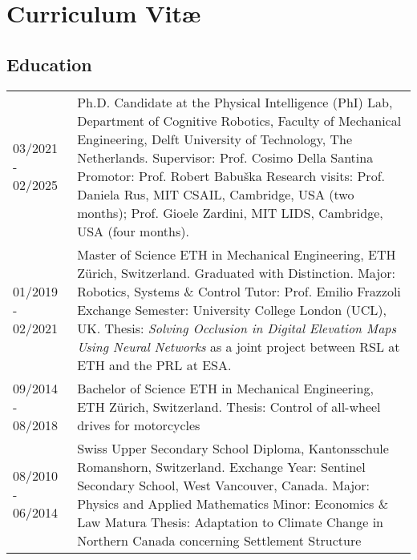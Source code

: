 \chapter*{Curriculum Vit\ae}

\makeatletter
\authors{\@firstname\ {\titleshape\@lastname}}
\makeatother

\noindent

\section*{Education}
\noindent
\begin{longtable}{p{} p{}}
    03/2021 - 02/2025 & Ph.D. Candidate at the Physical Intelligence (PhI) Lab, Department of Cognitive Robotics, Faculty of Mechanical Engineering, Delft University of Technology, The Netherlands. \newline 
    Supervisor: Prof. Cosimo Della Santina \newline 
    Promotor: Prof. Robert Babuška \newline 
    Research visits: Prof. Daniela Rus, MIT CSAIL, Cambridge, USA (two months); Prof. Gioele Zardini, MIT LIDS, Cambridge, USA (four months). \\
    01/2019 - 02/2021 & Master of Science ETH in Mechanical Engineering, ETH Zürich, Switzerland. Graduated with Distinction. \newline
    Major: Robotics, Systems \& Control
    Tutor: Prof. Emilio Frazzoli \newline
    Exchange Semester: University College London (UCL), UK. \newline
    Thesis: \emph{Solving Occlusion in Digital Elevation Maps Using Neural Networks} as a joint project between RSL at ETH and the PRL at ESA.\\
    09/2014 - 08/2018 & Bachelor of Science ETH in Mechanical Engineering, ETH Zürich, Switzerland. \newline Thesis: Control of all-wheel drives for motorcycles\\
    08/2010 - 06/2014 & Swiss Upper Secondary School Diploma, Kantonsschule Romanshorn, Switzerland. \newline
    Exchange Year: Sentinel Secondary School, West Vancouver, Canada. \newline
    Major: Physics and Applied Mathematics \newline
    Minor: Economics \& Law \newline
    Matura Thesis: Adaptation to Climate Change in Northern Canada concerning Settlement Structure \newline
\end{longtable}

